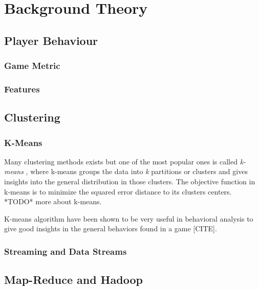 
\chapter{Background Theory} %
\label{Chapter2}


\section{Player Behaviour}
\subsection{Game Metric}
\subsection{Features}
\section{Clustering}
\subsection{K-Means}

Many clustering methods exists but one of the most popular ones is called \textit{k-means} \citep{Lloyd:1982}, where k-means groups the data into \textit{k} partitions or clusters and gives insights into the general distribution in those clusters. The objective function in k-means is to minimize the squared error distance to its clusters centers. *TODO* more about k-means. 

K-means algorithm have been shown to be very useful in behavioral analysis to give good insights in the general behaviors found in a game [CITE].

\subsection{Streaming and Data Streams}
\section{Map-Reduce and Hadoop}
